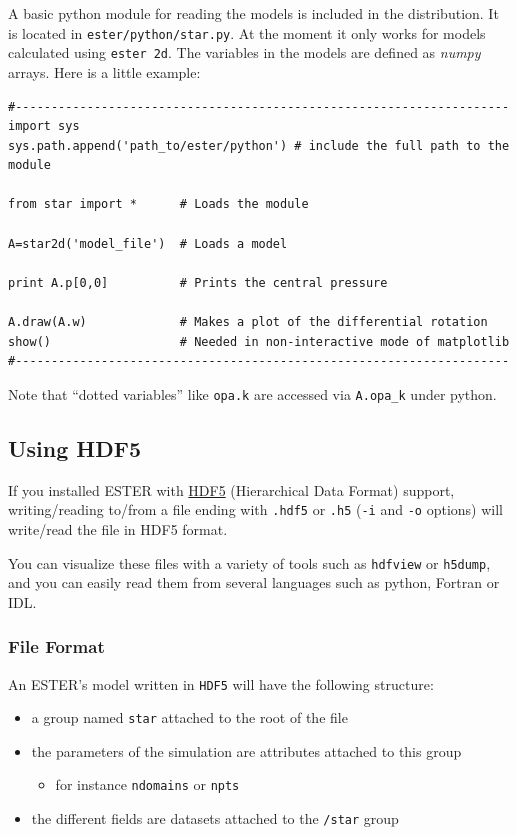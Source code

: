 A basic python module for reading the models is included in the
distribution. It is located in {\tt ester/python/star.py}. At the moment
it only works for models calculated using {\tt ester 2d}. The variables in
the models are defined as \emph{numpy} arrays. Here is a little example:

\begin{verbatim}
#---------------------------------------------------------------------
import sys
sys.path.append('path_to/ester/python') # include the full path to the module

from star import *      # Loads the module

A=star2d('model_file')  # Loads a model 

print A.p[0,0]          # Prints the central pressure

A.draw(A.w)             # Makes a plot of the differential rotation
show()                  # Needed in non-interactive mode of matplotlib
#---------------------------------------------------------------------
\end{verbatim}

Note that ``dotted variables'' like \verb|opa.k| are accessed via
\verb|A.opa_k| under python.

\subsection{Using HDF5}
If you installed ESTER with
\href{http://www.hdfgroup.org/HDF5/whatishdf5.html}{HDF5} (Hierarchical Data
Format) support, writing/reading to/from a file ending with \texttt{.hdf5} or
\texttt{.h5} (\texttt{-i} and \texttt{-o} options) will write/read the file in
HDF5 format.  

You can visualize these files with a variety of tools such as \texttt{hdfview}
or \texttt{h5dump}, and you can easily read them from several languages such as
python, Fortran or IDL.

\subsubsection{File Format}
An ESTER's model written in \texttt{HDF5} will have the following structure: 
\begin{itemize}
    \item a group named \texttt{star} attached to the root of the file
    \item the parameters of the simulation are attributes attached to this group
        \begin{itemize}
            \item for instance \texttt{ndomains} or \texttt{npts}
        \end{itemize}
    \item the different fields are datasets attached to the \texttt{/star} group
\end{itemize}

